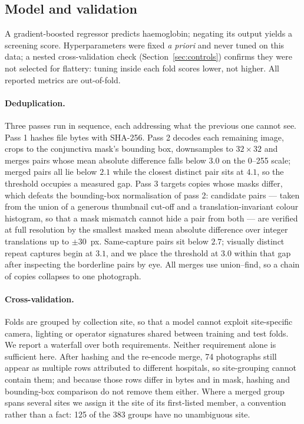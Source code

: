 \documentclass[11pt,a4paper]{article}
\begin{document}
\subsection{Model and validation}

A gradient-boosted regressor predicts haemoglobin; negating its output yields a screening
score. Hyperparameters were fixed \emph{a priori} and never tuned on this data; a nested
cross-validation check (Section~\ref{sec:controls}) confirms they were not selected for
flattery: tuning inside each fold scores lower, not higher.
All reported metrics are out-of-fold.

\paragraph{Deduplication.} Three passes run in sequence, each addressing what the previous one
cannot see. Pass 1 hashes file bytes with SHA-256. Pass 2 decodes each remaining image, crops to
the conjunctiva mask's bounding box, downsamples to $32\times32$ and merges pairs whose mean
absolute difference falls below 3.0 on the 0--255 scale; merged pairs all lie below $2.1$ while
the closest distinct pair sits at $4.1$, so the threshold occupies a measured gap. Pass 3 targets
copies whose masks differ, which defeats the bounding-box normalisation of pass 2: candidate pairs
--- taken from the union of a generous thumbnail cut-off and a translation-invariant colour
histogram, so that a mask mismatch cannot hide a pair from both --- are verified at full
resolution by the smallest masked mean absolute difference over integer translations up to
$\pm30$~px. Same-capture pairs sit below $2.7$; visually distinct repeat captures begin at $3.1$,
and we place the threshold at 3.0 within that gap after inspecting the borderline pairs by eye.
All merges use union--find, so a chain of copies collapses to one photograph.

\paragraph{Cross-validation.} Folds are grouped by collection site, so that a model cannot exploit
site-specific camera, lighting or operator signatures shared between training and test folds. We
report a waterfall over both requirements. Neither requirement alone is
sufficient here. After hashing and the re-encode merge, 74 photographs still appear as multiple
rows attributed to different hospitals, so site-grouping cannot contain them; and because those
rows differ in bytes and in mask, hashing and bounding-box comparison do not remove them either.
Where a merged group spans several sites we assign it the site of its first-listed member, a
convention rather than a fact: 125 of the 383 groups have no unambiguous site.
\end{document}
